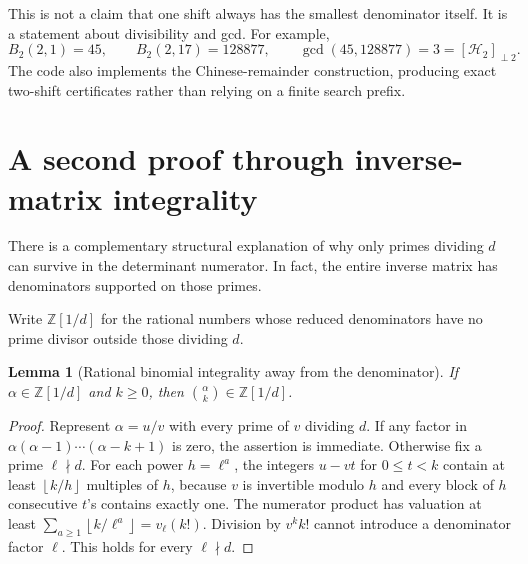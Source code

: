 \documentclass[11pt,a4paper]{article}
\newtheorem{lemma}[theorem]{Lemma}
\theoremstyle{definition}
\theoremstyle{remark}
\newcommand{\Z}{\mathbb Z}
\newcommand{\HH}{\mathcal H}
\newcommand{\floor}[1]{\left\lfloor #1\right\rfloor}
\newcommand{\freepart}[2]{\left[#1\right]_{\perp #2}}
\begin{document}
This is not a claim that one shift always has the smallest denominator
itself. It is a statement about divisibility and gcd. For example,
\[
 B_2(2,1)=45,\qquad B_2(2,17)=128877,
 \qquad\gcd(45,128877)=3=\freepart{\HH_2}{2}.
\]
The code also implements the Chinese-remainder construction, producing
exact two-shift certificates rather than relying on a finite search prefix.

\section{A second proof through inverse-matrix integrality}
\label{sec:inverse}

There is a complementary structural explanation of why only primes dividing
$d$ can survive in the determinant numerator. In fact, the entire inverse
matrix has denominators supported on those primes.

Write $\Z[1/d]$ for the rational numbers whose reduced denominators have
no prime divisor outside those dividing $d$.

\begin{lemma}[Rational binomial integrality away from the denominator]
\label{lem:binom}
If $\alpha\in\Z[1/d]$ and $k\ge0$, then
$\binom{\alpha}{k}\in\Z[1/d]$.
\end{lemma}
\begin{proof}
Represent $\alpha=u/v$ with every prime of $v$ dividing $d$.
If any factor in $\alpha(\alpha-1)\cdots(\alpha-k+1)$ is zero, the
assertion is immediate. Otherwise fix a prime $\ell\nmid d$.
For each power $h=\ell^a$, the integers $u-vt$ for $0\le t<k$
contain at least $\floor{k/h}$ multiples of $h$, because $v$ is invertible
modulo $h$ and every block of $h$ consecutive $t$'s contains exactly one.
The numerator product has valuation at least
$\sum_{a\ge1}\floor{k/\ell^a}=v_\ell(k!)$.
Division by $v^k k!$ cannot introduce a denominator factor $\ell$.
This holds for every $\ell\nmid d$.
\end{proof}
\end{document}
